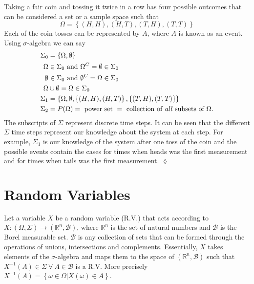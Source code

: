 \begin{example}
\label{ex:cointoss}
Taking a fair coin and tossing it twice in a row has four possible outcomes that can be considered a set or a sample space such that
$$\Omega = \left\lbrace (H,H), (H,T), (T,H), (T,T) \right\rbrace$$
Each of the coin tosses can be represented by $A$, where $A$ is known as an event.
Using $\sigma$-algebra we can say
\begin{align*}
\Sigma_0 &= \left\lbrace \Omega, \emptyset \right\rbrace \\
\Omega &\in \Sigma_0 \textnormal{~and~} \Omega^C = \emptyset \in \Sigma_0 \\
\emptyset &\in \Sigma_0 \textnormal{~and~} \emptyset^C = \Omega \in \Sigma_0 \\
\Omega &\cup \emptyset = \Omega \in \Sigma_0 \\
\Sigma_1 &= \left\lbrace \Omega, \emptyset, \left\lbrace (H,H), (H,T) \right\rbrace, \left\lbrace (T,H), (T,T) \right\rbrace \right\rbrace \\
\Sigma_2 &= P(\Omega) = \textnormal{~power~set~} = \textnormal{~collection~of~\textit{all}~subsets~of~} \Omega.
\end{align*}
The subscripts of $\Sigma$ represent discrete time steps.
It can be seen that the different $\Sigma$ time steps represent our knowledge about the system at each step.
For example, $\Sigma_1$ is our knowledge of the system after one toss of the coin and the possible events contain the cases for times when heads was the first measurement and for times when tails was the first measurement.
$\lozenge$
\end{example}

\section{Random Variables}
Let a variable $X$ be a random variable (R.V.) that acts according to \\
$X: (\Omega, \Sigma) \to (\mathbb{R}^n, \mathcal{B})$, where $\mathbb{R}^n$ is the set of natural numbers and $\mathcal{B}$ is the Borel measurable set.
$\mathcal{B}$ is any collection of sets that can be formed through the operations of unions, intersections and complements.
Essentially, $X$ takes elements of the $\sigma$-algebra and maps them to the space of $(\mathbb{R}^n, \mathcal{B})$ such that $X^{-1}(A) \in \Sigma~\forall~A \in \mathcal{B}$ is a R.V.
More precisely $X^{-1}(A) = \left\lbrace \omega \in \Omega | X(\omega) \in A \right\rbrace$.


